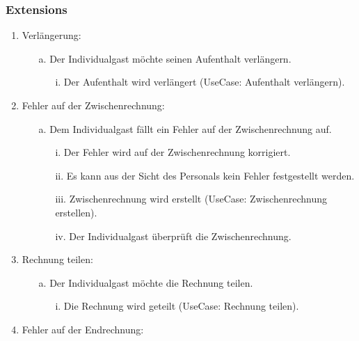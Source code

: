 \documentclass[./detailed_overview_usecases.tex]{subfiles}
\begin{document}
    \subsubsection*{Extensions}
    \begin{enumerate}
        \item Verlängerung:
                \begin{itemize}
                       \item[a.] Der Individualgast möchte seinen Aufenthalt verlängern.
                            \begin{itemize}
                                \item[i.] Der Aufenthalt wird verlängert (UseCase: Aufenthalt verlängern).
                            \end{itemize}
                \end{itemize}
        \setcounter{emuni}{2}
        \item Fehler auf der Zwischenrechnung:
            \begin{itemize}
                \item[a.] Dem Individualgast fällt ein Fehler auf der Zwischenrechnung auf.
                \begin{itemize}
                    \item[i.] Der Fehler wird auf der Zwischenrechnung korrigiert.
                    \item[ii.] Es kann aus der Sicht des Personals kein Fehler festgestellt werden.
                    \item[iii.] Zwischenrechnung wird erstellt (UseCase: Zwischenrechnung erstellen).
                    \item[iv.] Der Individualgast überprüft die Zwischenrechnung.
                \end{itemize}
            \end{itemize}
        \setcounter{emuni}{2}
        \item Rechnung teilen:
        \begin{itemize}
            \item[a.] Der Individualgast möchte die Rechnung teilen.
            \begin{itemize}
                \item[i.] Die Rechnung wird geteilt (UseCase: Rechnung teilen).
            \end{itemize}
        \end{itemize}
        \item Fehler auf der Endrechnung:

\end{enumerate}
\end{document}
